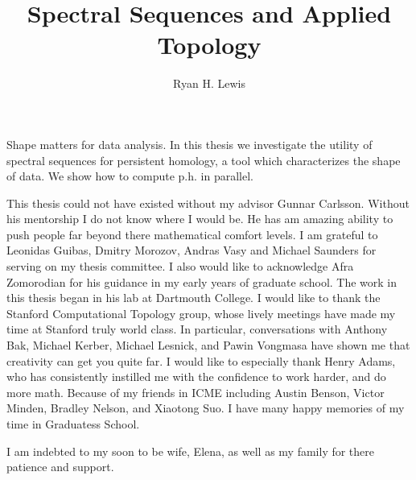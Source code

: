 \documentclass[12pt,twsoside]{report}
\title{Spectral Sequences and Applied Topology}
\author{Ryan H. Lewis}
\begin{document}
\maketitle

%
Shape matters for data analysis. In this thesis we investigate the utility of spectral sequences for persistent homology, a tool which characterizes the shape of data. We show how to compute p.h. in parallel. 


This thesis could not have existed without my advisor Gunnar Carlsson. Without his mentorship I do not know where I would be. He has am amazing ability to push people far beyond there mathematical comfort levels. I am grateful to Leonidas Guibas, Dmitry Morozov, Andras Vasy and Michael Saunders for serving on my thesis committee. I also would like to acknowledge Afra Zomorodian for his guidance in my early years of graduate school. The work in this thesis began in his lab at Dartmouth College. I would like to thank the Stanford Computational Topology group, whose lively meetings have made my time at Stanford truly world class. In particular, conversations with Anthony Bak, Michael Kerber, Michael Lesnick, and Pawin Vongmasa have shown me that creativity can get you quite far. I would like to especially thank Henry Adams, who has consistently instilled me with the confidence to work harder, and do more math. Because of my friends in ICME including Austin Benson, Victor Minden, Bradley Nelson, and Xiaotong Suo. I have many happy memories of my time in Graduatess School. 

I am indebted to my soon to be wife, Elena, as well as my family for there patience and support.

 \afterpreface
%







% 
\end{document}
